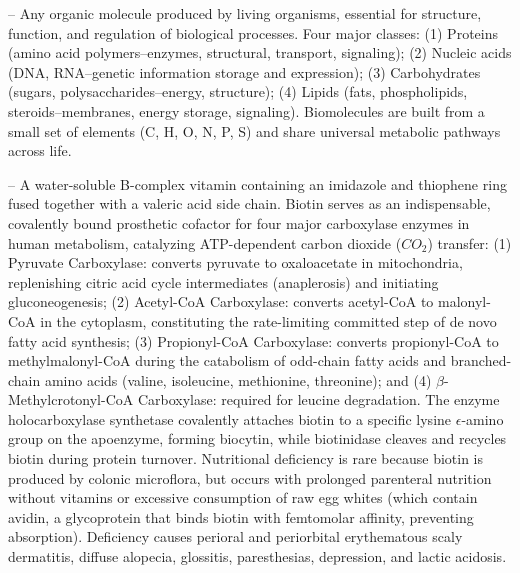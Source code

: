 -- Any organic molecule produced by living organisms, essential for structure, function, and regulation of biological processes. Four major classes: (1) Proteins (amino acid polymers--enzymes, structural, transport, signaling); (2) Nucleic acids (DNA, RNA--genetic information storage and expression); (3) Carbohydrates (sugars, polysaccharides--energy, structure); (4) Lipids (fats, phospholipids, steroids--membranes, energy storage, signaling). Biomolecules are built from a small set of elements (C, H, O, N, P, S) and share universal metabolic pathways across life.

-- A water-soluble B-complex vitamin containing an imidazole and thiophene ring fused together with a valeric acid side chain. Biotin serves as an indispensable, covalently bound prosthetic cofactor for four major carboxylase enzymes in human metabolism, catalyzing ATP-dependent carbon dioxide ($CO_2$) transfer: (1) Pyruvate Carboxylase: converts pyruvate to oxaloacetate in mitochondria, replenishing citric acid cycle intermediates (anaplerosis) and initiating gluconeogenesis; (2) Acetyl-CoA Carboxylase: converts acetyl-CoA to malonyl-CoA in the cytoplasm, constituting the rate-limiting committed step of de novo fatty acid synthesis; (3) Propionyl-CoA Carboxylase: converts propionyl-CoA to methylmalonyl-CoA during the catabolism of odd-chain fatty acids and branched-chain amino acids (valine, isoleucine, methionine, threonine); and (4) $\beta$-Methylcrotonyl-CoA Carboxylase: required for leucine degradation. The enzyme holocarboxylase synthetase covalently attaches biotin to a specific lysine $\epsilon$-amino group on the apoenzyme, forming biocytin, while biotinidase cleaves and recycles biotin during protein turnover. Nutritional deficiency is rare because biotin is produced by colonic microflora, but occurs with prolonged parenteral nutrition without vitamins or excessive consumption of raw egg whites (which contain avidin, a glycoprotein that binds biotin with femtomolar affinity, preventing absorption). Deficiency causes perioral and periorbital erythematous scaly dermatitis, diffuse alopecia, glossitis, paresthesias, depression, and lactic acidosis.

